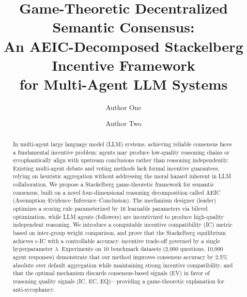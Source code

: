 \documentclass[runningheads]{llncs}
\begin{document}
\title{Game-Theoretic Decentralized Semantic Consensus:\\ An AEIC-Decomposed Stackelberg Incentive Framework\\for Multi-Agent LLM Systems}


\author{Author One \and Author Two}


\maketitle

\begin{abstract}
In multi-agent large language model (LLM) systems, achieving reliable consensus faces a fundamental incentive problem: agents may produce low-quality reasoning chains or sycophantically align with upstream conclusions rather than reasoning independently. Existing multi-agent debate and voting methods lack formal incentive guarantees, relying on heuristic aggregation without addressing the moral hazard inherent in LLM collaboration. We propose a Stackelberg game-theoretic framework for semantic consensus, built on a novel four-dimensional reasoning decomposition called AEIC (Assumption--Evidence--Inference--Conclusion). The mechanism designer (leader) optimizes a scoring rule parameterized by 16 learnable parameters via bilevel optimization, while LLM agents (followers) are incentivized to produce high-quality independent reasoning. We introduce a computable incentive compatibility (IC) metric based on inter-group weight comparison, and prove that the Stackelberg equilibrium achieves $\epsilon$-IC with a controllable accuracy--incentive trade-off governed by a single hyperparameter $\lambda$. Experiments on 10 benchmark datasets (2{,}000 questions, 10{,}000 agent responses) demonstrate that our method improves consensus accuracy by 2.5\% absolute over default aggregation while maintaining strong incentive compatibility, and that the optimal mechanism discards consensus-based signals (EV) in favor of reasoning quality signals (IC, EC, EQ)---providing a game-theoretic explanation for anti-sycophancy.

\end{abstract}
\end{document}
